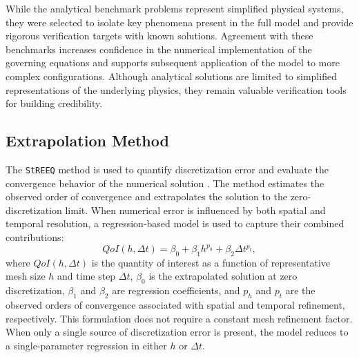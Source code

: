 While the analytical benchmark problems represent simplified physical systems, they were selected to isolate key phenomena present in the full model and provide rigorous verification targets with known solutions. Agreement with these benchmarks increases confidence in the numerical implementation of the governing equations and supports subsequent application of the model to more complex configurations. Although analytical solutions are limited to simplified representations of the underlying physics, they remain valuable verification tools for building credibility.

\subsection{Extrapolation  Method}
The \texttt{StREEQ} method is used to quantify discretization error and evaluate the convergence behavior of the numerical solution \cite{streeq_theory,streeq_git}. The method estimates the observed order of convergence and extrapolates the solution to the zero-discretization limit. When numerical error is influenced by both spatial and temporal resolution, a regression-based model is used to capture their combined contributions:
\begin{equation}
QoI(h, \Delta t) = \beta_0 + \beta_1 h^{p_h} + \beta_2 \Delta t^{p_t},
\label{eq:streeq_model_p2}
\end{equation}
where $QoI(h, \Delta t)$ is the quantity of interest as a function of representative mesh size $h$ and time step $\Delta t$, $\beta_0$ is the extrapolated solution at zero discretization, $\beta_1$ and $\beta_2$ are regression coefficients, and $p_h$ and $p_t$ are the observed orders of convergence associated with spatial and temporal refinement, respectively. This formulation does not require a constant mesh refinement factor. When only a single source of discretization error is present, the model reduces to a single-parameter regression in either $h$ or $\Delta t$.

